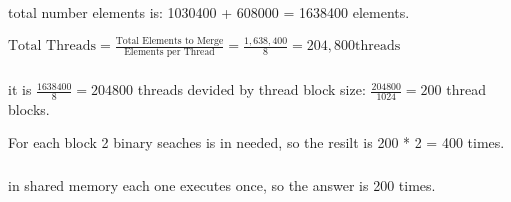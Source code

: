 \documentclass{article}
\begin{document}
\subsection{}
\subsubsection{}
total number elements is: 1030400 + 608000 = 1638400 elements.

\(\text{Total Threads} = \frac{\text{Total Elements to Merge}}{\text{Elements per Thread}} = \frac{1,638,400}{8} = 204,800 \text{threads}\)

\subsubsection{}
it is $\frac{1638400}{8} = 204800$ threads devided by thread block size: $\frac{204800}{1024} = 200$ thread blocks.

For each block 2 binary seaches is in needed, so the resilt is 200 * 2 = 400 times.

\subsubsection{}
in shared memory each one executes once, so the answer is 200 times.
\end{document}
